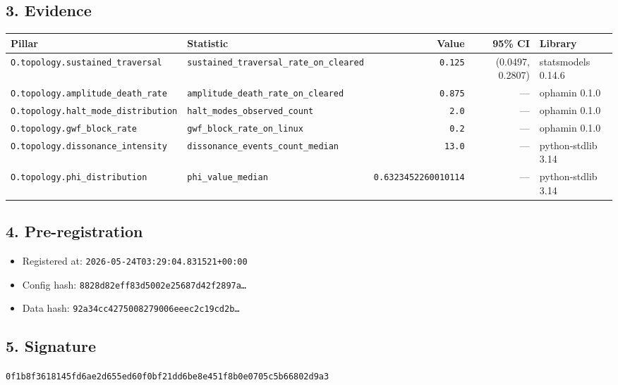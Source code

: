 \documentclass{article}
\begin{document}
\subsection*{3. Evidence}
\begin{tabular}{llrrl}\toprule
\textbf{Pillar} & \textbf{Statistic} & \textbf{Value} & \textbf{95\% CI} & \textbf{Library} \\\midrule
\texttt{O.topology.sustained\_traversal} & \texttt{sustained\_traversal\_rate\_on\_cleared} & \texttt{0.125} & (0.0497, 0.2807) & statsmodels 0.14.6 \\
\texttt{O.topology.amplitude\_death\_rate} & \texttt{amplitude\_death\_rate\_on\_cleared} & \texttt{0.875} & --- & ophamin 0.1.0 \\
\texttt{O.topology.halt\_mode\_distribution} & \texttt{halt\_modes\_observed\_count} & \texttt{2.0} & --- & ophamin 0.1.0 \\
\texttt{O.topology.gwf\_block\_rate} & \texttt{gwf\_block\_rate\_on\_linux} & \texttt{0.2} & --- & ophamin 0.1.0 \\
\texttt{O.topology.dissonance\_intensity} & \texttt{dissonance\_events\_count\_median} & \texttt{13.0} & --- & python-stdlib 3.14 \\
\texttt{O.topology.phi\_distribution} & \texttt{phi\_value\_median} & \texttt{0.6323452260010114} & --- & python-stdlib 3.14 \\
\bottomrule\end{tabular}
\subsection*{4. Pre-registration}
\begin{itemize}
\item Registered at: \texttt{2026-05-24T03:29:04.831521+00:00}
\item Config hash: \texttt{8828d82eff83d5002e25687d42f2897a\dots}
\item Data hash: \texttt{92a34cc4275008279006eeec2c19cd2b\dots}
\end{itemize}
\subsection*{5. Signature}
\texttt{0f1b8f3618145fd6ae2d655ed60f0bf21dd6be8e451f8b0e0705c5b66802d9a3}\\
\end{document}
